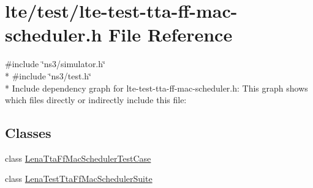 \hypertarget{lte-test-tta-ff-mac-scheduler_8h}{}\section{lte/test/lte-\/test-\/tta-\/ff-\/mac-\/scheduler.h File Reference}
\label{lte-test-tta-ff-mac-scheduler_8h}
{\ttfamily \#include \char`\"{}ns3/simulator.\+h\char`\"{}}\\*
{\ttfamily \#include \char`\"{}ns3/test.\+h\char`\"{}}\\*
Include dependency graph for lte-\/test-\/tta-\/ff-\/mac-\/scheduler.h\+:
This graph shows which files directly or indirectly include this file\+:
\subsection*{Classes}
\begin{DoxyCompactItemize}
\item 
class \hyperlink{classLenaTtaFfMacSchedulerTestCase}{Lena\+Tta\+Ff\+Mac\+Scheduler\+Test\+Case}
\item 
class \hyperlink{classLenaTestTtaFfMacSchedulerSuite}{Lena\+Test\+Tta\+Ff\+Mac\+Scheduler\+Suite}
\end{DoxyCompactItemize}

